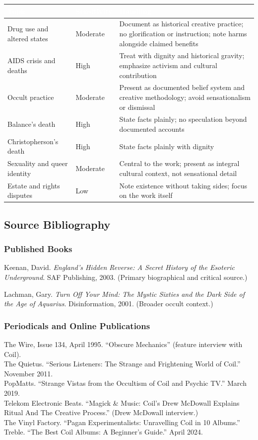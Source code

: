 \documentclass[11pt,letterpaper]{article}
\newcommand{\tableheader}[1]{\textbf{\sffamily\textcolor{white}{#1}}}
\begin{document}
\begin{center}
\begin{tabularx}{\textwidth}{L{3.5cm}L{3cm}X}
\toprule
{}
\tableheader{Topic} & \tableheader{Sensitivity} & \tableheader{Handling} \\
\midrule
Drug use and altered states & Moderate & Document as historical creative practice; no glorification or instruction; note harms alongside claimed benefits \\
AIDS crisis and deaths & High & Treat with dignity and historical gravity; emphasize activism and cultural contribution \\
Occult practice & Moderate & Present as documented belief system and creative methodology; avoid sensationalism or dismissal \\
Balance's death & High & State facts plainly; no speculation beyond documented accounts \\
Christopherson's death & High & State facts plainly with dignity \\
Sexuality and queer identity & Moderate & Central to the work; present as integral cultural context, not sensational detail \\
Estate and rights disputes & Low & Note existence without taking sides; focus on the work itself \\
\bottomrule
\end{tabularx}
\end{center}

\subsection{Source Bibliography}

\subsubsection{Published Books}
Keenan, David. \textit{England's Hidden Reverse: A Secret History of the Esoteric Underground}. SAF Publishing, 2003. (Primary biographical and critical source.)

Lachman, Gary. \textit{Turn Off Your Mind: The Mystic Sixties and the Dark Side of the Age of Aquarius}. Disinformation, 2001. (Broader occult context.)

\subsubsection{Periodicals and Online Publications}
The Wire, Issue 134, April 1995. ``Obscure Mechanics'' (feature interview with Coil). \\
The Quietus. ``Serious Listeners: The Strange and Frightening World of Coil.'' November 2011. \\
PopMatts. ``Strange Vistas from the Occultism of Coil and Psychic TV.'' March 2019. \\
Telekom Electronic Beats. ``Magick \& Music: Coil's Drew McDowall Explains Ritual And The Creative Process.'' (Drew McDowall interview.) \\
The Vinyl Factory. ``Pagan Experimentalists: Unravelling Coil in 10 Albums.'' \\
Treble. ``The Best Coil Albums: A Beginner's Guide.'' April 2024.
\end{document}
